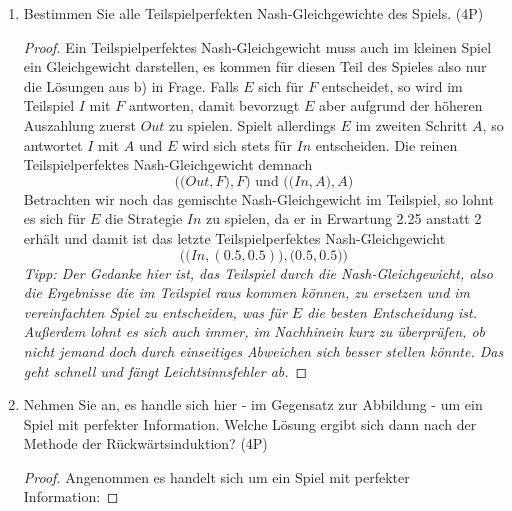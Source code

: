 \documentclass[12pt]{article}
\begin{document}
\begin{enumerate}[label=\alph*\upshape)]
\begin{proof}
			\textit{Auch hier ist es nicht ganz klar, ob nur reine Gleichgewichte gesucht sind.} Betrachtet man wieder die Gleichgewichtsbedingung für gemischte Gleichgewichte, wobei $p$ die Wahrscheinlichkeit ist, dass $E$ die Strategie $F$ spielt und $q$ die Wahrscheinlichkeit ist, dass $I$ die Strategie $F$ spielt, so folgt
			$$ \mathbb{E}[u_1(F)] = 1 \cdot q + 2 \cdot (1 - q) = 0 \cdot q + 3 \cdot (1 - q) = \mathbb{E}[u_1(A)] \iff q = 0.5  $$
			und aufgrund der Symmetrie folgt auch $p = 0.5$. Das heißt, das Nash-Gleichgewicht in gemischten Strategien ist
			$$ \Big( \big(0.5, 0.5\big), \big(0.5, 0.5\big) \Big) $$
			und die erwartete Auszahlung ist damit $(2.25, 1.75)$.	
		\end{proof}
	\item Bestimmen Sie alle Teilspielperfekten Nash-Gleichgewichte des Spiels. (4P)
		\begin{proof}
			Ein Teilspielperfektes Nash-Gleichgewicht muss auch im kleinen Spiel ein Gleichgewicht darstellen, es kommen für diesen Teil des Spieles also nur die Lösungen aus b) in Frage. Falls $E$ sich für $F$ entscheidet, so wird im Teilspiel $I$ mit $F$ antworten, damit bevorzugt $E$ aber aufgrund der höheren Auszahlung zuerst $Out$ zu spielen. Spielt allerdings $E$ im zweiten Schritt $A$, so antwortet $I$ mit $A$ und $E$ wird sich stets für $In$ entscheiden. Die reinen Teilspielperfektes Nash-Gleichgewicht demnach
			$$ \Big(\big(Out, F\big), F \Big) \text{ und } \Big(\big(In, A\big), A \Big) $$
			Betrachten wir noch das gemischte Nash-Gleichgewicht im Teilspiel, so lohnt es sich für $E$ die Strategie $In$ zu spielen, da er in Erwartung 2.25 anstatt 2 erhält und damit ist das letzte Teilspielperfektes Nash-Gleichgewicht
			$$ \Big( \big(In, (0.5, 0.5) \big), \big(0.5, 0.5 \big) \Big) $$
		\textit{Tipp: Der Gedanke hier ist, das Teilspiel durch die Nash-Gleichgewicht, also die Ergebnisse die im Teilspiel raus kommen können, zu ersetzen und im vereinfachten Spiel zu entscheiden, was für $E$ die besten Entscheidung ist. Außerdem lohnt es sich auch immer, im Nachhinein kurz zu überprüfen, ob nicht jemand doch durch einseitiges Abweichen sich besser stellen könnte. Das geht schnell und fängt Leichtsinnsfehler ab.}
		\end{proof}
	\item Nehmen Sie an, es handle sich hier - im Gegensatz zur Abbildung - um ein Spiel mit perfekter Information. Welche Lösung ergibt sich dann nach der Methode der Rückwärtsinduktion? (4P) ~\newpage
		\begin{proof}
			Angenommen es handelt sich um ein Spiel mit perfekter Information:

\end{proof}
\end{enumerate}
\end{document}
